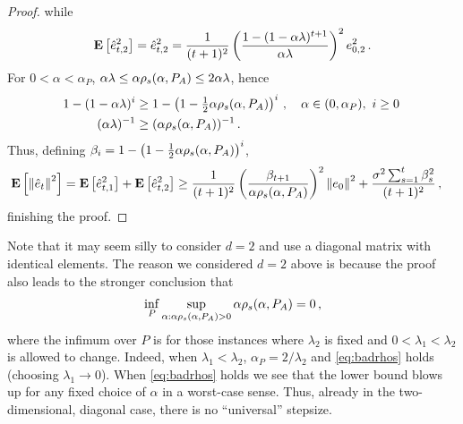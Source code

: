 \begin{proof}
while
\begin{align*}
\mathbf{E}\left[\hat{e}^2_{t,2}\right] = \hat{e}^2_{t,2} = 
\frac{1}{(t+1)^2} \left(\frac{1-(1-\alpha \lambda)^{t+1}}{ \alpha \lambda}\right)^2 e_{0,2}^2\,.
\end{align*}
For $0<\alpha<\alpha_P$, $\alpha\lambda \le \alpha \rho_s(\alpha,P_A) \le 2\alpha \lambda$, hence 
\begin{align*}
1-(1-\alpha \lambda)^i &\ge 1-\left(1-\tfrac12 \alpha \rho_s(\alpha,P_A)\right)^i\,, \quad \alpha \in (0,\alpha_P), \,\, i \ge 0\,\\
(\alpha \lambda)^{-1} &\ge  (\alpha \rho_s(\alpha,P_A))^{-1}\,.
\end{align*}
Thus, defining $\beta_i = 1-\left(1-\tfrac12 \alpha \rho_s(\alpha,P_A)\right)^i$,
\begin{align*}
\mathbf{E}\left[ \left\| \hat{e}_t\right\|^2 \right] 
& = \mathbf{E}\left[\hat{e}^2_{t,1}\right] + \mathbf{E}\left[\hat{e}^2_{t,2}\right] 
   \ge \frac{1}{(t+1)^2} 
   \left(\frac{\beta_{t+1}}{ \alpha \rho_s(\alpha,P_A)}\right)^2 \left\| e_0\right\|^2
   +
    \frac{ \sigma^2 \sum_{s=1}^t \beta_{s}^2 }{(t+1)^2}\,,
\end{align*}
finishing the proof.
\end{proof}

Note that it may seem silly to consider $d=2$ and use a diagonal matrix with identical elements.
The reason we considered $d=2$ above is because the proof also leads to the stronger conclusion
that 
\begin{align}
\inf_P \sup_{\alpha: \alpha \rho_s(\alpha,P_A)>0} \alpha \rho_s(\alpha,P_A) = 0\,,
\label{eq:badrhos}
\end{align}
where the infimum over $P$ is for those
instances where $\lambda_2$ is fixed and $0<\lambda_1<\lambda_2$ is allowed to change.
Indeed, when $\lambda_1<\lambda_2$, $\alpha_P = 2/\lambda_2$ and \eqref{eq:badrhos} holds (choosing $\lambda_1\to 0$). 
When \eqref{eq:badrhos} holds we see that the lower bound blows up for any fixed choice of $\alpha$ in a worst-case sense. Thus, already in the two-dimensional, diagonal case, there is no ``universal'' stepsize.

